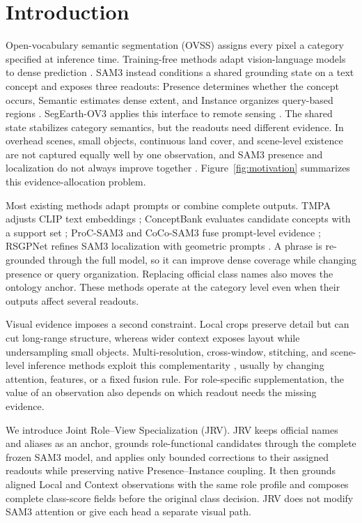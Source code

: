 \section{Introduction}
\label{sec:introduction}

Open-vocabulary semantic segmentation (OVSS) assigns every pixel a category specified at inference time. Training-free methods adapt vision-language models to dense prediction \cite{R01,R06}. SAM3 instead conditions a shared grounding state on a text concept and exposes three readouts: Presence determines whether the concept occurs, Semantic estimates dense extent, and Instance organizes query-based regions \cite{R10}. SegEarth-OV3 applies this interface to remote sensing \cite{R11}. The shared state stabilizes category semantics, but the readouts need different evidence. In overhead scenes, small objects, continuous land cover, and scene-level existence are not captured equally well by one observation, and SAM3 presence and localization do not always improve together \cite{R24}. Figure~\ref{fig:motivation} summarizes this evidence-allocation problem.

Most existing methods adapt prompts or combine complete outputs. TMPA adjusts CLIP text embeddings \cite{R08}; ConceptBank evaluates candidate concepts with a support set \cite{R09}; ProC-SAM3 and CoCo-SAM3 fuse prompt-level evidence \cite{R12,R13}; RSGPNet refines SAM3 localization with geometric prompts \cite{R25}. A phrase is re-grounded through the full model, so it can improve dense coverage while changing presence or query organization. Replacing official class names also moves the ontology anchor. These methods operate at the category level even when their outputs affect several readouts.

Visual evidence imposes a second constraint. Local crops preserve detail but can cut long-range structure, whereas wider context exposes layout while undersampling small objects. Multi-resolution, cross-window, stitching, and scene-level inference methods exploit this complementarity \cite{R14,R15,R18,R26}, usually by changing attention, features, or a fixed fusion rule. For role-specific supplementation, the value of an observation also depends on which readout needs the missing evidence.

We introduce Joint Role--View Specialization (JRV). JRV keeps official names and aliases as an anchor, grounds role-functional candidates through the complete frozen SAM3 model, and applies only bounded corrections to their assigned readouts while preserving native Presence--Instance coupling. It then grounds aligned Local and Context observations with the same role profile and composes complete class-score fields before the original class decision. JRV does not modify SAM3 attention or give each head a separate visual path.

